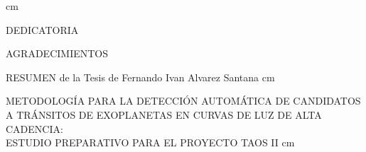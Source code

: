 \noindent
\leftright{\rule{6.5 cm}{.2 pt} }{ \rule{7.1 cm}{.2pt}}
\begin{scriptsize}
\end{scriptsize}
\begin{scriptsize}%
\end{scriptsize}
 cm

\noindent
\leftright{\rule{6.5 cm}{.2 pt} }{ \rule{7.1 cm}{.2pt}}
\begin{scriptsize}
\end{scriptsize}
\begin{scriptsize}
\end{scriptsize}
\thispagestyle{plain}
\centerline{DEDICATORIA}
\vskip 5cm





\newpage 
\thispagestyle{plain}
\centerline{AGRADECIMIENTOS}
\vskip 2cm



\newpage
\singlespacing
\thispagestyle{plain}
RESUMEN de la Tesis de Fernando Ivan Alvarez Santana 
 cm
\begin{center}
METODOLOGÍA PARA LA DETECCIÓN AUTOMÁTICA DE CANDIDATOS A TRÁNSITOS DE EXOPLANETAS EN CURVAS DE LUZ DE ALTA CADENCIA: \\ ESTUDIO PREPARATIVO PARA EL PROYECTO TAOS II
 cm
\end{center}

